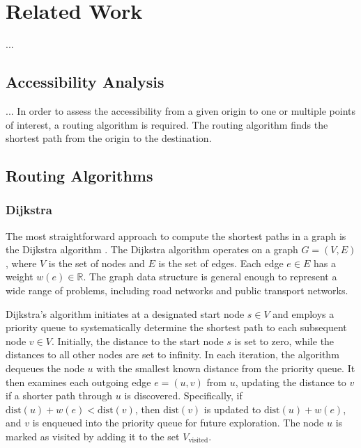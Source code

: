 \clearpage
\section{Related Work}
\label{sec:related_work}

...

\subsection{Accessibility Analysis}
\label{subsec:accessibility_analysis}


...
In order to assess the accessibility from a given origin to one or multiple
points of interest, a routing algorithm is required. The routing algorithm finds
the shortest path from the origin to the destination.

\subsection{Routing Algorithms}
\label{subsec:routing_algorithms}


\subsubsection{Dijkstra}
\label{subsubsec:dijkstra}
The most straightforward approach to compute the shortest paths in a graph is
the Dijkstra algorithm \cite{dijkstra1959note}. The Dijkstra algorithm operates
on a graph \( G = (V, E) \), where \( V \) is the set of nodes and \( E \) is
the set of edges. Each edge \( e \in E \) has a weight
\( w(e) \in \mathbb{R}\). The graph data structure is general enough to
represent a wide range of problems, including road networks and public
transport networks.

Dijkstra's algorithm initiates at a designated start node \( s \in V \) and
employs a priority queue to systematically determine the shortest path to each
subsequent node \( v \in V \). Initially, the distance to the start node \( s
\) is set to zero, while the distances to all other nodes are set to infinity.
In each iteration, the algorithm dequeues the node \( u \) with the smallest
known distance from the priority queue. It then examines each outgoing edge \(
e = (u, v) \) from \( u \), updating the distance to \( v \) if a shorter path
through \( u \) is discovered. Specifically, if
\( \text{dist}(u) + w(e) < \text{dist}(v) \), then \( \text{dist}(v) \) is
updated to \( \text{dist}(u) + w(e) \), and \( v \) is enqueued into the
priority queue for future exploration. The node \( u \) is marked as visited by
adding it to the set \( V_{\text{visited}} \).

